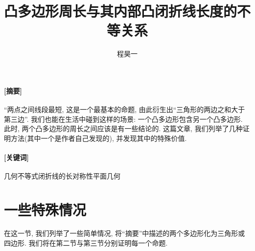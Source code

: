 \documentclass{article}
\title{凸多边形周长与其内部凸闭折线长度的不等关系}
\author{\kaishu 程昊一\\\kaishu{\normalsize(西安市铁一中学分校\hspace{1em}2024届励志AQ班)}}
\begin{document}
\maketitle
\paragraph{\textbf{[摘要]}\hspace{1em}}“两点之间线段最短, 这是一个最基本的命题, 由此衍生出“三角形的两边之和大于第三边”. 我们也能在生活中碰到这样的场景: 一个凸多边形包含另一个凸多边形. 此时, 两个凸多边形的周长之间应该是有一些结论的. 这篇文章, 我们列举了几种证明方法(其中一个是作者自己发现的), 并发现其中的特殊价值.
\paragraph{\textbf{[关键词]}\hspace{1em}}几何不等式\quad 闭折线的长\quad 对称性\quad 平面几何

\section{一些特殊情况}
在这一节, 我们列举了一些简单情况, 将“摘要”中描述的两个多边形化为三角形或四边形. 我们将在第二节与第三节分别证明每一个命题.
\end{document}
